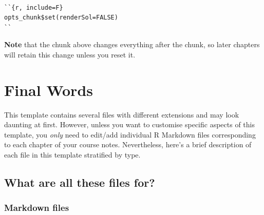 \documentclass[
]{book}
\theoremstyle{definition}
\theoremstyle{definition}
\theoremstyle{definition}
\theoremstyle{remark}
\begin{document}
\begin{verbatim}

``{r, include=F}
opts_chunk$set(renderSol=FALSE)
``
\end{verbatim}

\textbf{Note} that the chunk above changes everything after the chunk, so later chapters will retain this change unless you reset it.

\hypertarget{final-words}{%
\chapter{Final Words}\label{final-words}}

This template contains several files with different extensions and may look daunting at first. However, unless you want to customise specific aspects of this template, you \emph{only} need to edit/add individual R Markdown files corresponding to each chapter of your course notes. Nevertheless, here's a brief description of each file in this template stratified by type.

\hypertarget{what-are-all-these-files-for}{%
\section{What are all these files for?}\label{what-are-all-these-files-for}}

\hypertarget{markdown-files}{%
\subsection*{Markdown files}\label{markdown-files}}
\end{document}
